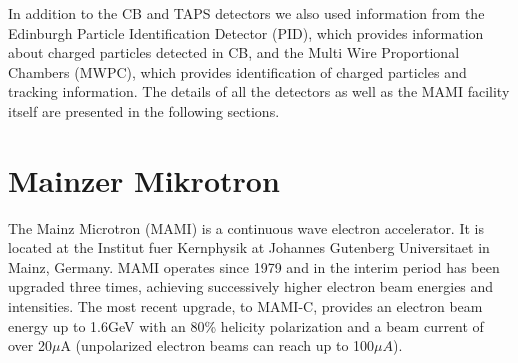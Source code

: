 In addition to the CB and TAPS detectors we also used information from  the Edinburgh Particle Identification Detector (PID), which provides information about charged particles detected in CB, and the Multi Wire Proportional Chambers (MWPC), which provides identification of charged particles and tracking information. The details of all the detectors as well as the MAMI facility itself are presented in the following sections.

\section{Mainzer Mikrotron}

\indent The Mainz Microtron (MAMI) is a continuous wave electron accelerator. It is located at the Institut fuer Kernphysik at Johannes Gutenberg Universitaet in Mainz, Germany. MAMI operates since 1979 and in the interim period has been upgraded three times, achieving successively higher electron beam energies and intensities. The most recent upgrade, to MAMI-C, provides an  electron beam energy up to 1.6GeV with an 80\% helicity polarization and a beam current of over 20$\mu$A (unpolarized electron beams can reach up to 100$\mu A$).

